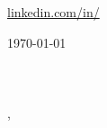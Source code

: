 \documentclass[12pt]{letter}
\begin{document}

\newcommand{\resumeProjectHeading}[2]{
    \item
    \begin{tabular*}{0.97\textwidth}{l@{\extracolsep{\fill}}r}
      \small#1 & #2 \\
    \end{tabular*}\vspace{-7pt}
}



\newcommand{\resumeItem}[1]{
  \item\small{
    {#1 \vspace{-2pt}}
  }
}

\newcommand{\resumeSubItem}[1]{\resumeItem{#1}\vspace{-4pt}}

\renewcommand\labelitemii{$\vcenter{\hbox{\tiny$\bullet$}}$}
\newcommand{\resumeSubHeadingListStart}{\begin{itemize}[leftmargin=0.15in, label={}, itemsep=0pt]}

\newcommand{\resumeSubHeadingListEnd}{\end{itemize}}
\newcommand{\resumeItemListStart}{\begin{itemize}}
\newcommand{\resumeItemListEnd}{\end{itemize}\vspace{-5pt}}

\begin{center}
{\fontsize{28}{0}\selectfont\scshape \myname}

\href{mailto:\myemail}{\faEnvelope\enspace \myemail}\hfill
\href{https://linkedin.com/in/\mylinkedin}{\faLinkedinIn\enspace linkedin.com/in/\mylinkedin}\hfill
\href{tel:\myphone}{\faPhone\enspace \myphone}\hfill
\faMapMarker\enspace \mylocation
\end{center}

\vspace{0.2in}

\today\\

\vspace{-0.1in}\recipient\\
\company\\
\street\\
\city, \state\ \zip\\
\end{document}
